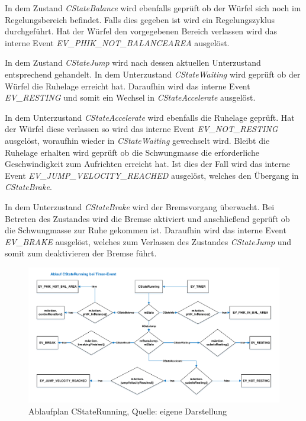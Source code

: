 \documentclass{article}
\begin{document}
In dem Zustand \textit{CStateBalance} wird ebenfalls geprüft ob der Würfel sich noch im Regelungsbereich befindet. Falls dies gegeben ist wird ein Regelungszyklus durchgeführt. Hat der Würfel den vorgegebenen Bereich verlassen wird das interne Event \textit{EV\_PHIK\_NOT\_BALANCEAREA} ausgelöst.

In dem Zustand \textit{CStateJump} wird nach dessen aktuellen Unterzustand entsprechend gehandelt. 
In dem Unterzustand \textit{CStateWaiting}  wird geprüft ob der Würfel die Ruhelage erreicht hat. Daraufhin wird das interne Event \textit{EV\_RESTING} und somit ein Wechsel in \textit{CStateAccelerate} ausgelöst. 

In dem Unterzustand \textit{CStateAccelerate} wird ebenfalls die Ruhelage geprüft. Hat der Würfel diese verlassen so wird das interne Event \textit{EV\_NOT\_RESTING} ausgelöst, woraufhin wieder in \textit{CStateWaiting} gewechselt wird. Bleibt die Ruhelage erhalten wird geprüft ob die Schwungmasse die erforderliche Geschwindigkeit zum Aufrichten erreicht hat. Ist dies der Fall wird das interne Event \textit{EV\_JUMP\_VELOCITY\_REACHED} ausgelöst, welches den Übergang in \textit{CStateBrake}. 


In dem Unterzustand \textit{CStateBrake} wird der Bremsvorgang überwacht. Bei Betreten des Zustandes wird die Bremse aktiviert und anschließend geprüft ob die Schwungmasse zur Ruhe gekommen ist. Daraufhin wird das interne Event \textit{EV\_BRAKE} ausgelöst, welches zum Verlassen des Zustandes \textit{CStateJump} und somit zum deaktivieren der Bremse führt.

\begin{figure}[h]
	\includegraphics[width=\linewidth]{PAP_CStateRunning}
	\caption{Ablaufplan CStateRunning, Quelle: eigene Darstellung}
\end{figure}


\newpage
\end{document}
